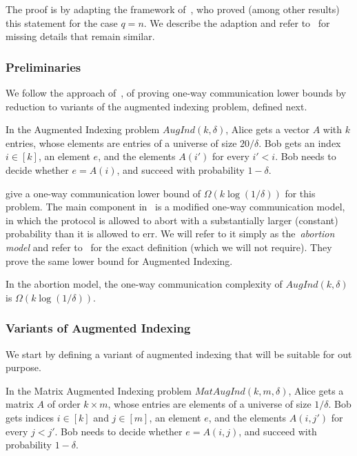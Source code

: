 The proof is by adapting the framework of~\cite{molinaro2013beating}, who proved (among other results) this statement for the case $q=n$.
We describe the adaption and refer to~\cite{molinaro2013beating} for missing details that remain similar.

\subsubsection{Preliminaries}
We follow the approach of~\cite{jayram2013optimal}, of proving one-way communication lower bounds by reduction to variants of the augmented indexing problem, defined next.
\begin{definition}\label{def:augind}
In the Augmented Indexing problem $AugInd(k,\delta)$, Alice gets a vector $A$ with $k$ entries, whose elements are entries of a universe of size $20/\delta$.
Bob gets an index $i\in[k]$, an element $e$, and the elements $A(i')$ for every $i'<i$.
Bob needs to decide whether $e=A(i)$, and succeed with probability $1-\delta$.
\end{definition}

\cite{jayram2013optimal} give a one-way communication lower bound of $\Omega(k\log(1/\delta))$ for this problem.
The main component in~\cite{molinaro2013beating} is a modified one-way communication model, in which the protocol is allowed to abort with a substantially larger (constant) probability than it is allowed to err.
We will refer to it simply as the~\emph{abortion model} and refer to~\cite{molinaro2013beating} for the exact definition (which we will not require).
They prove the same lower bound for Augmented Indexing.
\begin{lemma}[informal]\label{lmm:augind}
In the abortion model, the one-way communication complexity of $AugInd(k,\delta)$ is $\Omega(k\log(1/\delta))$.
\end{lemma}

\subsubsection{Variants of Augmented Indexing}

We start by defining a variant of augmented indexing that will be suitable for out purpose.

\begin{definition}
In the Matrix Augmented Indexing problem $MatAugInd(k,m,\delta)$, Alice gets a matrix $A$ of order $k\times m$, whose entries are elements of a universe of size $1/\delta$.
Bob gets indices $i\in[k]$ and $j\in[m]$, an element $e$, and the elements $A(i,j')$ for every $j<j'$.
Bob needs to decide whether $e=A(i,j)$, and succeed with probability $1-\delta$.
\end{definition}

